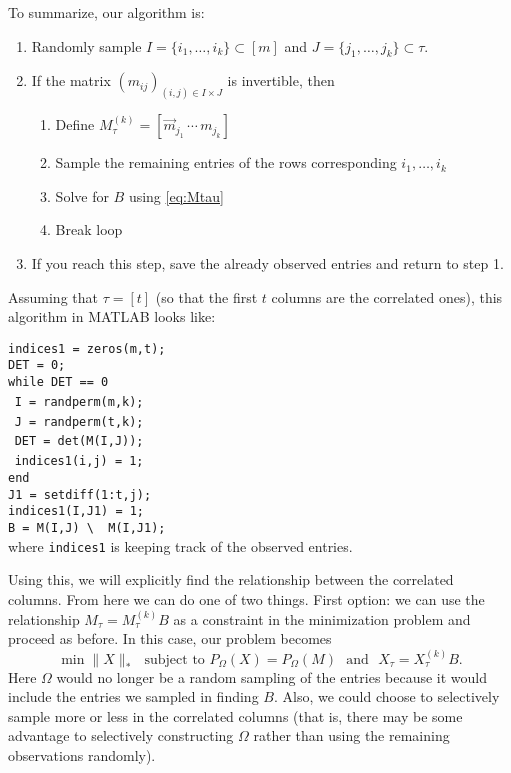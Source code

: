 \documentclass[12pt]{article}
\begin{document}
To summarize, our algorithm is: 
\begin{enumerate}
\item Randomly sample $I = \{i_1,\ldots, i_k\} \subset [m]$ and $J = \{j_1,\ldots, j_k\} \subset \tau$. 
\item If the matrix $(m_{ij})_{(i,j) \in I\times J}$ is invertible, then 
\begin{enumerate} 
\item Define $M^{(k)}_\tau = [\vec m_{j_1} \, \cdots \, m_{j_k}]$
\item Sample the remaining entries of the rows corresponding $i_1,\ldots, i_k$
\item Solve for $B$ using \eqref{eq:Mtau}
\item Break loop
\end{enumerate}
\item If you reach this step, save the already observed entries and return to step 1.
\end{enumerate}

Assuming that $\tau = [t]$ (so that the first $t$ columns are the correlated ones), this algorithm in MATLAB looks like: 

\noindent \texttt{indices1 = zeros(m,t);}\\
\texttt{DET = 0;}\\
\texttt{while DET == 0}\\
$\frac{}{}$\hspace{1cm}    \texttt{I = randperm(m,k);}\\
$\frac{}{}$\hspace{1cm}    \texttt{J = randperm(t,k);}\\
$\frac{}{}$\hspace{1cm}    \texttt{DET = det(M(I,J));}\\
$\frac{}{}$\hspace{1cm}    \texttt{indices1(i,j) = 1;}\\
\texttt{end}\\
\texttt{J1 = setdiff(1:t,j);}\\
\texttt{indices1(I,J1) = 1;}\\
\texttt{B = M(I,J) \textbackslash \, M(I,J1);}\\

\noindent where \texttt{indices1} is keeping track of the observed entries.

Using this, we will explicitly find the relationship between the correlated columns. From here we can do one of two things. First option: we can use the relationship $M_\tau = M^{(k)}_\tau B$ as a constraint in the minimization problem and proceed as before. In this case, our problem becomes $$\min \| X \|_* \,\, \text{ subject to } P_{\Omega}(X) = P_{\Omega}(M) \,\, \text{ and } \,\, X_\tau = X^{(k)}_\tau B.$$ Here $\Omega$ would no longer be a random sampling of the entries because it would include the entries we sampled in finding $B$. Also, we could choose to selectively sample more or less in the correlated columns (that is, there may be some advantage to selectively constructing $\Omega$ rather than using the remaining observations randomly). 
\end{document}
